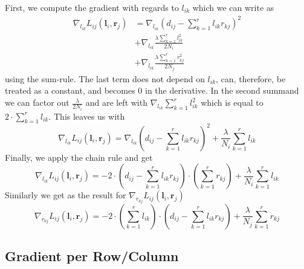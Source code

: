 \documentclass{support/acm_proc_article-sp}
\begin{document}
    First, we compute the gradient with regards to $l_{ik}$ which we can write as
    \begin{equation*}
        \begin{aligned}
            \nabla_{l_{ik}}L_{ij}(\mathbf{l}_i,\mathbf{r}_j)
                & = \nabla_{l_{ik}} \left(d_{ij} - \sum_{k=1}^r l_{ik}r_{kj} \right)^2 \\
                & + \nabla_{l_{ik}} \frac{\lambda\sum_{k=1}^r l_{ik}^2}{2N_i} \\
                & + \nabla_{l_{ik}} \frac{\lambda\sum_{k=1}^r r_{kj}^2}{2N_j}
        \end{aligned}
    \end{equation*}
    using the sum-rule.
    The last term does not depend on $l_{ik}$, can, therefore, be treated as a constant, and becomes $0$ in the
    derivative.
    In the second summand we can factor out $\frac{\lambda}{2N_i}$ and are left with $\nabla_{l_{ik}}\sum_{k=1}^r l_{ik}^2$
    which is equal to $2\cdot\sum_{k=1}^r l_{ik}$.
    This leaves us with
    \begin{equation*}
        \nabla_{l_{ik}}L_{ij}(\mathbf{l}_i,\mathbf{r}_j) = \nabla_{l_{ik}} \left(d_{ij} - \sum_{k=1}^r l_{ik}r_{kj} \right)^2
                                                         + \frac{\lambda}{N_i}\sum_{k=1}^r l_{ik}
    \end{equation*}
    Finally, we apply the chain rule and get
    \begin{equation*}
        \nabla_{l_{ik}}L_{ij}(\mathbf{l}_i,\mathbf{r}_j) =
            -2\cdot(d_{ij} - \sum_{k=1}^r l_{ik}r_{kj}) \cdot (\sum_{k=1}^r r_{kj})
            + \frac{\lambda}{N_i}\sum_{k=1}^r l_{ik}
    \end{equation*}
    Similarly we get as the result for $\nabla_{r_{kj}}L_{ij}(\mathbf{l}_i,\mathbf{r}_j)$
    \begin{equation*}
        \nabla_{r_{kj}}L_{ij}(\mathbf{l}_i,\mathbf{r}_j) =
        -2\cdot(\sum_{k=1}^r l_{ik})\cdot(d_{ij} - \sum_{k=1}^r l_{ik}r_{kj})
        + \frac{\lambda}{N_j}\sum_{k=1}^r r_{kj}
    \end{equation*}


    \subsection{Gradient per Row/Column}
\end{document}
